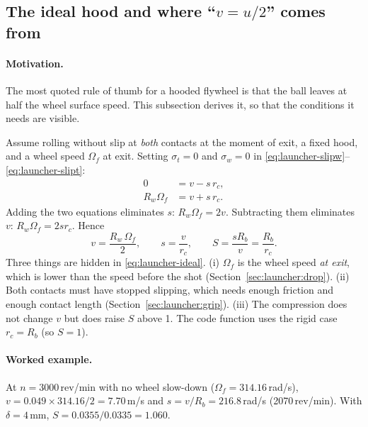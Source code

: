 \subsection{The ideal hood and where ``$v = u/2$'' comes from}
\label{sec:launcher:ideal}

\paragraph{Motivation.} The most quoted rule of thumb for a hooded flywheel is that the ball leaves at
half the wheel surface speed. This subsection derives it, so that the conditions it needs are visible.

Assume rolling without slip at \emph{both} contacts at the moment of exit, a fixed hood, and a wheel speed
$\Omega_f$ at exit. Setting $\sigma_t = 0$ and $\sigma_w = 0$ in
\eqref{eq:launcher-slipw}--\eqref{eq:launcher-slipt}:
\begin{align}
  0 &= v - s\,r_c, \label{eq:launcher-rollhood}\\
  R_w\Omega_f &= v + s\,r_c. \label{eq:launcher-rollwheel}
\end{align}
Adding the two equations eliminates $s$: $R_w\Omega_f = 2v$. Subtracting them eliminates $v$:
$R_w\Omega_f = 2 s r_c$. Hence
\begin{equation}
  v = \frac{R_w\,\Omega_f}{2}, \qquad s = \frac{v}{r_c}, \qquad
  S = \frac{s R_b}{v} = \frac{R_b}{r_c}.
  \label{eq:launcher-ideal}
\end{equation}
Three things are hidden in \eqref{eq:launcher-ideal}. (i) $\Omega_f$ is the wheel speed \emph{at exit}, which
is lower than the speed before the shot (Section~\ref{sec:launcher:drop}). (ii) Both contacts must have
stopped slipping, which needs enough friction and enough contact length
(Section~\ref{sec:launcher:grip}). (iii) The compression does not change $v$ but does raise $S$ above 1.
The code function  uses the rigid case $r_c = R_b$ (so $S = 1$).

\paragraph{Worked example.} At $n = 3000$\,\unit{rev/min}\assumed{} with no wheel slow-down
($\Omega_f = 314.16$\,\unit{rad/s}\derived), $v = 0.049\times314.16/2 = 7.70$\,\unit{m/s}\derived{} and
$s = v/R_b = 216.8$\,\unit{rad/s}\derived{} (2070\,\unit{rev/min}\derived). With $\delta = 4$\,\unit{mm}\userval,
$S = 0.0355/0.0335 = 1.060$\derived.

